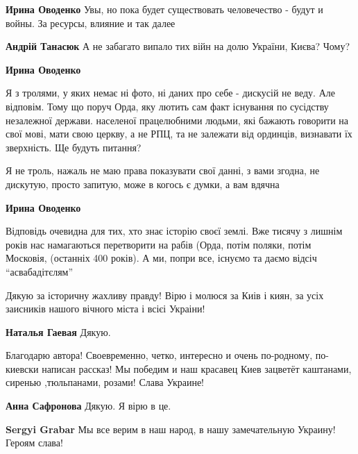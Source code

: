 \begin{itemize}
\begin{itemize}
\begin{itemize} %
\textbf{Ирина Оводенко} Увы, но пока будет существовать человечество - будут и войны. За ресурсы, влияние и так далее

\textbf{Андрій Танасюк} А не забагато випало тих війн на долю України, Києва? Чому?

\textbf{Ирина Оводенко} 

Я з тролями, у яких немає ні фото, ні даних про себе - дискусій не веду. Але
відповім. Тому що поруч Орда, яку лютить сам факт існування по сусідству
незалежної держави. населеної працелюбними людьми, які бажають говорити на свої
мові, мати свою церкву, а не РПЦ, та не залежати від ординців, визнавати їх
зверхність. Ще будуть питання?

\end{itemize} %


Я не троль, нажаль не маю права показувати свої данні, з вами згодна, не
дискутую, просто запитую, може в когось є думки, а вам вдячна


\textbf{Ирина Оводенко} 

Відповідь очевидна для тих, хто знає історію своєї землі. Вже тисячу з лишнім
років нас намагаються перетворити на рабів (Орда, потім поляки, потім Московія,
(останніх 400 років). А ми, попри все, існуємо та даємо відсіч \enquote{асвабадітєлям}

\end{itemize} %

Дякую за історичну жахливу правду! Вірю і молюся за Киів і киян, за усіх заисників нашого вічного міста і всієі Украіни!

\textbf{Наталья Гаевая} Дякую.


Благодарю автора! Своевременно, четко, интересно и очень по-родному, по-киевски
написан рассказ! Мы победим и наш красавец Киев зацветёт каштанами, сиренью
,тюльпанами, розами! Слава Украине!

\begin{itemize} %
\textbf{Анна Сафронова} Дякую. Я вірю в це.

\textbf{Sergyi Grabar} Мы все верим в наш народ, в нашу замечательную Украину! Героям слава!
\end{itemize} %


\end{itemize}
